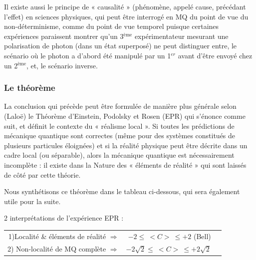 Il existe aussi le principe de « causalité » (phénomène, appelé cause, précédant l’effet) en
sciences physiques, qui peut être interrogé en MQ du point de vue du non-déterminisme,
comme du point de vue temporel puisque certaines expériences paraissent montrer qu’un
3$^{\text{ème}}$ expérimentateur mesurant une polarisation de photon (dans un état superposé) ne peut
distinguer entre, le scénario où le photon a d’abord été manipulé par un 1$^{er}$ avant d’être
envoyé chez un 2$^{\text{ème}}$, et, le scénario inverse.
\subsubsection{Le théorème}
La conclusion qui précède peut être formulée de manière plus générale selon (Laloë) le
Théorème d’Einstein, Podolsky et Rosen (EPR) qui s’énonce comme suit, et définit le
contexte du « réalisme local ».
Si toutes les prédictions de mécanique quantique sont correctes (même pour des systèmes
constitués de plusieurs particules éloignées) et si la réalité physique peut être décrite dans
un cadre local (ou séparable), alors la mécanique quantique est nécessairement
incomplète : il existe dans la Nature des « éléments de réalité » qui sont laissés de côté par
cette théorie.

Nous synthétisons ce théorème dans le tableau ci-dessous, qui sera également utile pour la
suite.

2 interprétations de l'expérience EPR :

\begin{tabular}{rrc}
1)Localité \& éléments de réalité $\Rightarrow$ & $-2\leqslant\ <C>\ \leqslant+2$ (Bell)\\
2) Non-localité de MQ complète $\Rightarrow$&$-2\sqrt{2}\leqslant\ <C>\ \leqslant+2\sqrt{2}$\\
\end{tabular}
